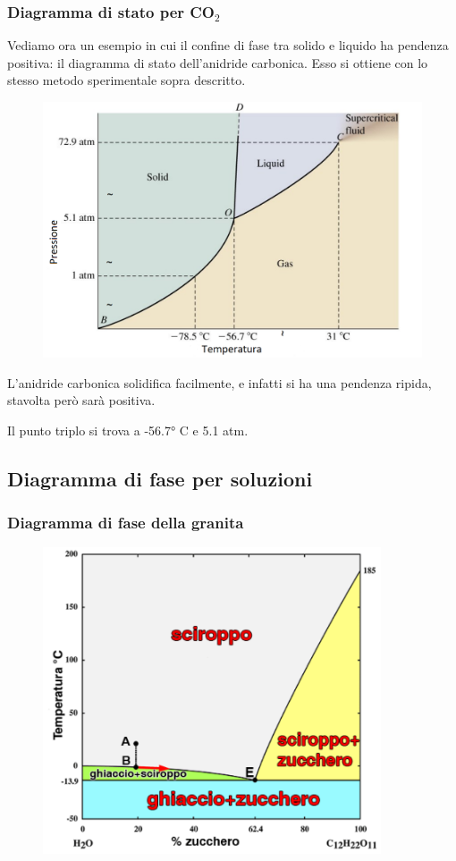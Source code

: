 \subsubsection{Diagramma di stato per CO$_2$}

Vediamo ora un esempio in cui il confine di fase tra solido e liquido ha pendenza positiva: il diagramma di stato dell'anidride carbonica. Esso si ottiene con lo stesso metodo sperimentale sopra descritto.

\begin{figure}[htp]
    \centering
    \includegraphics[width=12cm]{immagini/diagramma_di_stato_CO2.png}
\end{figure}

L'anidride carbonica solidifica facilmente, e infatti si ha una pendenza ripida, stavolta però sarà positiva.

Il punto triplo si trova a -56.7° C e 5.1 atm.

\subsection{Diagramma di fase per soluzioni}
\subsubsection{Diagramma di fase della granita}

\begin{figure}[htp]
    \centering
    \includegraphics[width=10cm]{immagini/diagramma_di_stato_sciroppo.png}
\end{figure}

